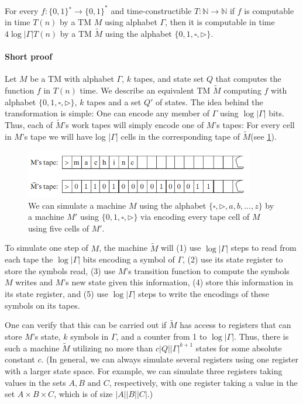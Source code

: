 \documentclass[a4paper,12pt]{article}
\begin{document}
For every $f : \{0, 1\}^{∗} \rightarrow \{0, 1\}^{*}$ and time-constructible $T :  \mathbb{N} →  \mathbb{N}$ if $f$ is
computable in time $T(n)$ by a TM $M$ using alphabet $\Gamma$, then it is computable in time $4 \log{|\Gamma|}T(n)$ by a TM $\widetilde{M}$ using the alphabet $\{0, 1, \square, \rhd \}$.

\paragraph{Short proof}

Let $M$ be a TM with alphabet $\Gamma$, $k$ tapes, and state set $Q$ that computes
the function $f$ in $T(n)$ time. We describe an equivalent TM $\widetilde{M}$ computing $f$ with alphabet $\{0, 1, \square, \rhd \}$, $k$ tapes and a set $Q'$ of states. The idea behind the transformation is simple:
One can encode any member of $\Gamma$ using $\log |\Gamma|$ bits. Thus, each of $\widetilde{M}$'s work tapes will
simply encode one of $M$’s tapes: For every cell in $M$'s tape we will have log |$\Gamma$| cells in
the corresponding tape of $\widetilde{M}$(see \ref{fig:scetch1}).

\begin{figure}[!ht]
\centering
\includegraphics[width=10cm]{scetch1.png}
\caption{We can simulate a machine $M$ using the alphabet $\{\square, \rhd, a, b, ..., z \}$ by a machine $M'$ using $\{0, 1, \square, \rhd \}$ via encoding every tape cell of $M$ using five cells of $M'$.}
\label{fig:scetch1}
\end{figure}

\par	
To simulate one step of $M$, the machine $\widetilde{M}$ will (1) use $\log |\Gamma|$ steps to read from
each tape the $\log |\Gamma|$ bits encoding a symbol of $\Gamma$, (2) use its state register to store the
symbols read, (3) use $M$’s transition function to compute the symbols $M$ writes and $M$'s
new state given this information, (4) store this information in its state register, and (5)
use $\log |\Gamma|$ steps to write the encodings of these symbols on its tapes.
\par 
One can verify that this can be carried out if $\widetilde{M}$ has access to registers that can
store $M$'s state, $k$ symbols in $\Gamma$, and a counter from 1 to $\log |\Gamma|$. Thus, there is such a
machine $\widetilde{M}$ utilizing no more than $c|Q||\Gamma|^{k+1}$ states for some absolute constant $c$. (In
general, we can always simulate several registers using one register with a larger state
space. For example, we can simulate three registers taking values in the sets $A, B \text{ and } C$, respectively, with one register taking a value in the set $A \times B \times C$, which is of size $|A| |B| |C|$.)
\end{document}
